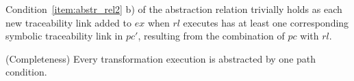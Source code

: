 \begin{pf}
\begin{itemize}
Condition~\ref{item:abstr_rel2} b) of the abstraction relation trivially holds as each new traceability link added to $ex$ when $rl$ executes has at least one corresponding symbolic traceability link in $pc'$, resulting from the combination of $pc$ with $rl$.  

\end{itemize}
\end{pf}

\begin{proposition}{(Completeness)}
\label{prop:pc_completeness_appendix}
Every transformation execution is abstracted by one path condition.
\end{proposition}

